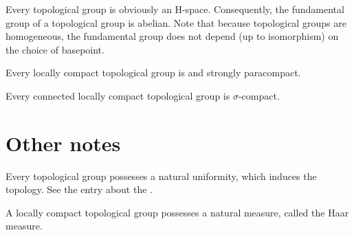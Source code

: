 \documentclass[12pt]{article}
\begin{document}
Every topological group is obviously an H-space.
Consequently, the fundamental group of a topological group is abelian.
Note that because topological groups are homogeneous,
the fundamental group does not depend (up to isomorphism)
on the choice of basepoint.

Every locally compact topological group
is  and strongly paracompact.

Every connected locally compact topological group is $\sigma$-compact.

\section*{Other notes}

Every topological group possesses a natural uniformity,
which induces the topology.
See the entry about the .

A locally compact topological group
possesses a natural measure, called the Haar measure.
\end{document}
